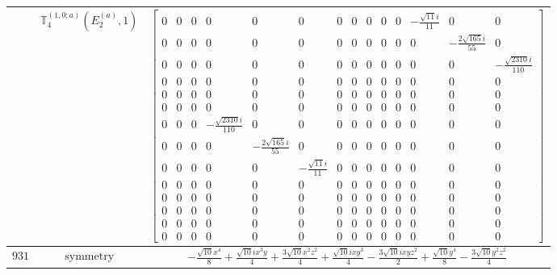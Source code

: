 \documentclass[fleqn,8pt,landscape]{jsarticle}
\begin{document}
\begin{longtable}{ccc}
$  $ & $ \mathbb{T}_{4}^{(1,0;a)}(E_{2}^{(a)},1) $ & $ \begin{bmatrix} 0 & 0 & 0 & 0 & 0 & 0 & 0 & 0 & 0 & 0 & 0 & - \frac{\sqrt{11} i}{11} & 0 & 0 \\ 0 & 0 & 0 & 0 & 0 & 0 & 0 & 0 & 0 & 0 & 0 & 0 & - \frac{2 \sqrt{165} i}{55} & 0 \\ 0 & 0 & 0 & 0 & 0 & 0 & 0 & 0 & 0 & 0 & 0 & 0 & 0 & - \frac{\sqrt{2310} i}{110} \\ 0 & 0 & 0 & 0 & 0 & 0 & 0 & 0 & 0 & 0 & 0 & 0 & 0 & 0 \\ 0 & 0 & 0 & 0 & 0 & 0 & 0 & 0 & 0 & 0 & 0 & 0 & 0 & 0 \\ 0 & 0 & 0 & 0 & 0 & 0 & 0 & 0 & 0 & 0 & 0 & 0 & 0 & 0 \\ 0 & 0 & 0 & - \frac{\sqrt{2310} i}{110} & 0 & 0 & 0 & 0 & 0 & 0 & 0 & 0 & 0 & 0 \\ 0 & 0 & 0 & 0 & - \frac{2 \sqrt{165} i}{55} & 0 & 0 & 0 & 0 & 0 & 0 & 0 & 0 & 0 \\ 0 & 0 & 0 & 0 & 0 & - \frac{\sqrt{11} i}{11} & 0 & 0 & 0 & 0 & 0 & 0 & 0 & 0 \\ 0 & 0 & 0 & 0 & 0 & 0 & 0 & 0 & 0 & 0 & 0 & 0 & 0 & 0 \\ 0 & 0 & 0 & 0 & 0 & 0 & 0 & 0 & 0 & 0 & 0 & 0 & 0 & 0 \\ 0 & 0 & 0 & 0 & 0 & 0 & 0 & 0 & 0 & 0 & 0 & 0 & 0 & 0 \\ 0 & 0 & 0 & 0 & 0 & 0 & 0 & 0 & 0 & 0 & 0 & 0 & 0 & 0 \\ 0 & 0 & 0 & 0 & 0 & 0 & 0 & 0 & 0 & 0 & 0 & 0 & 0 & 0 \end{bmatrix} $ \\ \hline
$ 931 $ & $ \text{symmetry} $ & $ - \frac{\sqrt{10} x^{4}}{8} + \frac{\sqrt{10} i x^{3} y}{4} + \frac{3 \sqrt{10} x^{2} z^{2}}{4} + \frac{\sqrt{10} i x y^{3}}{4} - \frac{3 \sqrt{10} i x y z^{2}}{2} + \frac{\sqrt{10} y^{4}}{8} - \frac{3 \sqrt{10} y^{2} z^{2}}{4} $ \\

\end{longtable}
\end{document}
